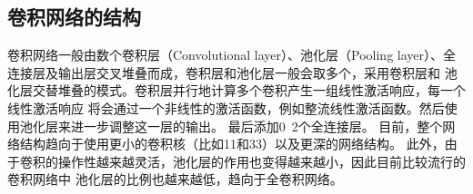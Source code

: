   
  \subsection{\hei\xiaosan\textbf{卷积网络的结构}}
    卷积网络一般由数个卷积层（Convolutional layer）、池化层（Pooling 
    layer）、全连接层及输出层交叉堆叠而成，卷积层和池化层一般会取多个，采用卷积层和
    池化层交替堆叠的模式。卷积层并行地计算多个卷积产生一组线性激活响应，每一个线性激活响应
    将会通过一个非线性的激活函数，例如整流线性激活函数。然后使用池化层来进一步调整这一层的输出。
    最后添加0~2个全连接层。
    目前，整个网络结构趋向于使用更小的卷积核（比如11和33）以及更深的网络结构。
    此外，由于卷积的操作性越来越灵活，池化层的作用也变得越来越小，因此目前比较流行的卷积网络中
    池化层的比例也越来越低，趋向于全卷积网络。
    
   
